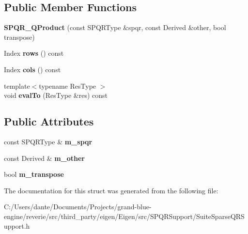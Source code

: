 \subsection*{Public Member Functions}
\begin{DoxyCompactItemize}
\item 
\mbox{\label{struct_eigen_1_1_s_p_q_r___q_product_a4dd7813eee45cf4b534557d964f721fe}} 
{\bfseries S\+P\+Q\+R\+\_\+\+Q\+Product} (const S\+P\+Q\+R\+Type \&spqr, const Derived \&other, bool transpose)
\item 
\mbox{\label{struct_eigen_1_1_s_p_q_r___q_product_ae51a3abe06dee2e628d61f444b54eddf}} 
Index {\bfseries rows} () const
\item 
\mbox{\label{struct_eigen_1_1_s_p_q_r___q_product_acfe8d7db5646002d38c21ff963510510}} 
Index {\bfseries cols} () const
\item 
\mbox{\label{struct_eigen_1_1_s_p_q_r___q_product_a753f511cb03accd8afc20041748b6287}} 
{\footnotesize template$<$typename Res\+Type $>$ }\\void {\bfseries eval\+To} (Res\+Type \&res) const
\end{DoxyCompactItemize}
\subsection*{Public Attributes}
\begin{DoxyCompactItemize}
\item 
\mbox{\label{struct_eigen_1_1_s_p_q_r___q_product_aa4f1d5149a920eef5cf29e8c11aa1c82}} 
const S\+P\+Q\+R\+Type \& {\bfseries m\+\_\+spqr}
\item 
\mbox{\label{struct_eigen_1_1_s_p_q_r___q_product_afa6a6593e13343b6d361467d25325ef5}} 
const Derived \& {\bfseries m\+\_\+other}
\item 
\mbox{\label{struct_eigen_1_1_s_p_q_r___q_product_a0470f0e6780dcd1185496d00e8281535}} 
bool {\bfseries m\+\_\+transpose}
\end{DoxyCompactItemize}


The documentation for this struct was generated from the following file\+:\begin{DoxyCompactItemize}
\item 
C\+:/\+Users/dante/\+Documents/\+Projects/grand-\/blue-\/engine/reverie/src/third\+\_\+party/eigen/\+Eigen/src/\+S\+P\+Q\+R\+Support/Suite\+Sparse\+Q\+R\+Support.\+h\end{DoxyCompactItemize}
